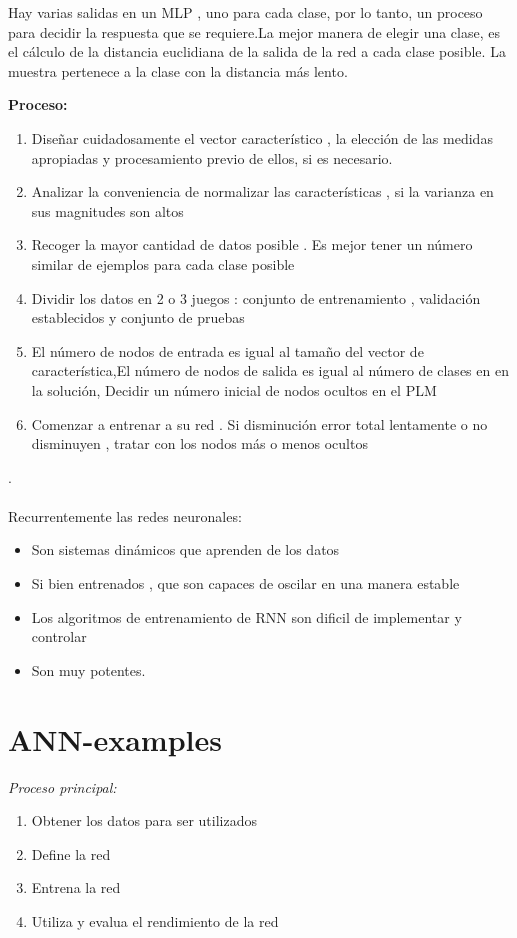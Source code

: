 \documentclass[11pt]{article}
\begin{document}
Hay varias salidas en un MLP , uno para cada clase, por lo tanto, un proceso para decidir la respuesta que se requiere.La mejor manera de elegir una clase, es el cálculo de la distancia euclidiana de la salida de la red a cada clase posible. La muestra pertenece a la clase con la distancia más lento.

\textbf{Proceso:}
\begin{enumerate}
\item Diseñar cuidadosamente el vector característico , la elección de las medidas apropiadas y procesamiento previo de ellos, si es necesario.
\item Analizar la conveniencia de normalizar las características , si la varianza en sus magnitudes son altos
\item Recoger la mayor cantidad de datos posible . Es mejor tener un número similar de ejemplos para cada clase posible
\item Dividir los datos en 2 o 3 juegos : conjunto de entrenamiento , validación establecidos y conjunto de pruebas
\item El número de nodos de entrada es igual al tamaño del vector de característica,El número de nodos de salida es igual al número de clases en en la solución,	Decidir un número inicial de nodos ocultos en el PLM 
\item Comenzar a entrenar a su red . Si disminución error total lentamente o no disminuyen , tratar con los nodos más o menos ocultos
\end{enumerate}
.\\\\
Recurrentemente las redes neuronales:
\begin{itemize}
\item Son sistemas dinámicos que aprenden de los datos 
\item Si bien entrenados , que son capaces de oscilar en una manera estable 
\item Los algoritmos de entrenamiento de RNN son dificil de implementar y controlar 
\item Son muy potentes.
\end{itemize}
\newpage

\section{ANN-examples}

\emph{Proceso principal:}
\begin{enumerate}
\item Obtener los datos para ser utilizados
\item Define la red
\item Entrena la red
\item Utiliza y evalua el rendimiento de la red
\end{enumerate}
\end{document}
